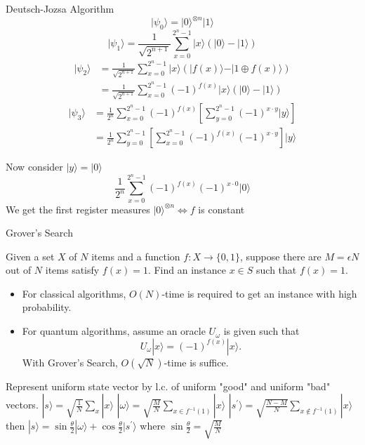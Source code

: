 \documentclass{beamer}
\newcommand{\<}{\langle}
\renewcommand{\>}{\rangle}
\begin{document}
\begin{frame}
\begin{columns}[t]
\begin{column}{.48\linewidth}
\begin{block}{Deutsch-Jozsa Algorithm}
$$\vert \psi_0 \rangle = \vert0\rangle^{\otimes n} \vert 1\rangle$$
$$\vert \psi_1 \rangle = \frac{1}{\sqrt{2^{n+1}}}\sum_{x=0}^{2^n-1} \vert x\rangle \left(|0\rangle - |1 \rangle \right)$$
$$
    \begin{aligned}
    \lvert \psi_2 \rangle  
        & = \frac{1}{\sqrt{2^{n+1}}}\sum_{x=0}^{2^n-1} \vert x\rangle (\vert f(x)\rangle - \vert 1 \oplus f(x)\rangle) \\  
        & = \frac{1}{\sqrt{2^{n+1}}}\sum_{x=0}^{2^n-1}(-1)^{f(x)}|x\rangle ( |0\rangle - |1\rangle ) 
    \end{aligned}
$$
$$
\begin{aligned}
    \lvert \psi_3 \rangle 
        & = \frac{1}{2^n}\sum_{x=0}^{2^n-1}(-1)^{f(x)}
            \left[ \sum_{y=0}^{2^n-1}(-1)^{x \cdot y} 
            \vert y \rangle \right] \\
        & = \frac{1}{2^n}\sum_{y=0}^{2^n-1}
            \left[ \sum_{x=0}^{2^n-1}(-1)^{f(x)}(-1)^{x \cdot y} \right]
            \vert y \rangle
\end{aligned}
$$

Now consider $|y\>=|0\>$
$$
\frac{1}{2^n}\sum_{x=0}^{2^n-1}(-1)^{f(x)}(-1)^{x \cdot 0}
            \vert 0 \rangle
$$
We get the first register measures $|0\>^{\otimes n} \iff f $ is constant

\end{block}



\begin{block}{Grover's Search}

\footnotesize

Given a set $X$ of $N$ items and a function $f : X \to \{0,1\}$, \newline
suppose there are $M=\epsilon N$ out of $N$ items satisfy $f(x)=1$. \newline
Find an instance $x \in S$ such that $f(x)=1$.
\begin{itemize}
    \item For classical algorithms, $O(N)$-time is required to get an instance with high probability.

    \item For quantum algorithms, assume an oracle $U_\omega$ is given such that 
$$
U_\omega|x\rangle = (-1)^{f(x)}|x\rangle .
$$
    With Grover's Search, $O(\sqrt{N})$-time is suffice.
\end{itemize}

Represent uniform state vector by l.c. of uniform "good" and uniform "bad" vectors. \newline
$|s\rangle = \sqrt{\frac{1}{N}}\sum_{x} |x\rangle$ \newline
$|\omega\rangle = \sqrt{\frac{M}{N}}\sum_{x \in f^{-1}(1)} |x\rangle$ \newline
$|s^{'}\rangle = \sqrt{\frac{N-M}{N}}\sum_{x \not \in f^{-1}(1)} |x\rangle$ \newline
then $|s\rangle = \sin\frac\theta2|\omega\rangle + \cos\frac\theta2|s^{'}\rangle$ where $\sin\frac\theta2 = \sqrt{\frac{M}{N}}$



\end{block}
\end{column}
\end{columns}
\end{frame}
\end{document}
